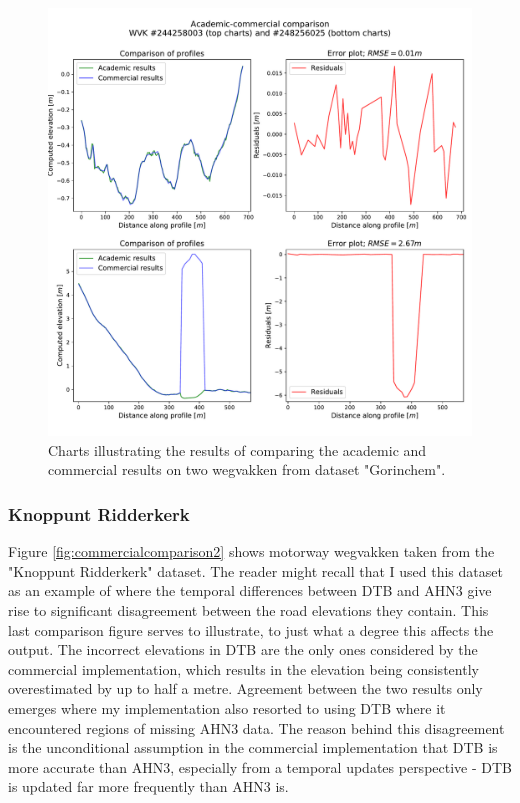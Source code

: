 \begin{figure}
    \centering
    \includegraphics[width=0.9\linewidth]{final_report/figs/commercialcomparison1.pdf}
    \caption{Charts illustrating the results of comparing the academic and commercial results on two wegvakken from dataset "Gorinchem".}
    \label{fig:commercialcomparison1}
\end{figure}

\subsubsection{Knoppunt Ridderkerk}

Figure \ref{fig:commercialcomparison2} shows motorway wegvakken taken from the "Knoppunt Ridderkerk" dataset. The reader might recall that I used this dataset as an example of where the temporal differences between DTB and AHN3 give rise to significant disagreement between the road elevations they contain. This last comparison figure serves to illustrate, to just what a degree this affects the output. The incorrect elevations in DTB are the only ones considered by the commercial implementation, which results in the elevation being consistently overestimated by up to half a metre. Agreement between the two results only emerges where my implementation also resorted to using DTB where it encountered regions of missing AHN3 data. The reason behind this disagreement is the unconditional assumption in the commercial implementation that DTB is more accurate than AHN3, especially from a temporal updates perspective - DTB is updated far more frequently than AHN3 is.

